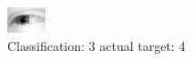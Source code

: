 \begin{figure}[h!]
\begin{center}
\includegraphics[width=0.60\columnwidth]{figures/ID2453_class_3_target_4.png}
\end{center}
\caption{ Classification: 3 actual target: 4}
\label{fig:ID2453_class_3_target_4}
\end{figure}
